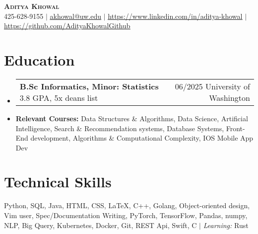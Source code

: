 \documentclass[letterpaper,11pt]{article}
\makeatletter
\newcommand{\resumeItem}[1]{
  \item\small{
    {#1 \vspace{-2pt}}
  }
}
\newcommand{\customSubheading}[4]{
  \vspace{-2pt}\item
    \begin{tabular*}{0.97\textwidth}[t]{l@{\extracolsep{\fill}}r}
      \textbf{#1} #2 & #3 #4 \\
    \end{tabular*}\vspace{-7pt}
}
\newcommand{\resumeSubHeadingListStart}{\begin{itemize}[leftmargin=0.15in, label={}]}
\newcommand{\resumeSubHeadingListEnd}{\end{itemize}}
\makeatother
\begin{document}

\begin{center}
    \textbf{\Huge \scshape Aditya Khowal} \\ \vspace{1pt}
    \small 425-628-9155 $|$ \href{mailto:akhowal@uw.edi}{\underline{akhowal@uw.edu}} $|$ 
    \href{https://www.linkedin.com/in/aditya-khowal}{\underline{https://www.linkedin.com/in/aditya-khowal}} $|$
    \href{https://github.com/AdityaKhowalGithub}{\underline{https://github.com/AdityaKhowalGithub}}
\end{center}


\section{Education}
  \resumeSubHeadingListStart
  \customSubheading{B.Sc Informatics, Minor: Statistics}{3.8 GPA, 5x deans list}{06/2025}{University of Washington}

  \resumeItem{ \textbf{Relevant Courses:} Data Structures \& Algorithms, Data Science, Artificial Intelligence, Search \& Recommendation systems, Database Systems, Front-End development, Algorithms \& Computational Complexity,  IOS Mobile App Dev}

    \resumeSubHeadingListEnd

\section{Technical Skills}
{\small  Python, SQL, Java, HTML, CSS, LaTeX, C++, Golang, Object-oriented design, Vim user, Spec/Documentation Writing, PyTorch, TensorFlow, Pandas, numpy, NLP, Big Query, Kubernetes, Docker, Git, REST Api, Swift, C $|$ \textit{Learning:} Rust}
    
\end{document}
